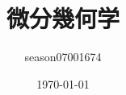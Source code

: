 \documentclass[uplatex]{jsarticle}
\title{微分幾何学}
\author{season07001674}
\date{\today}
\renewcommand{\(}{\left(}
\renewcommand{\)}{\right)}
\theoremstyle{definition}
\begin{document}
\maketitle
\tableofcontents










\nocite{*}


\end{document}
